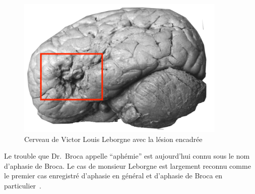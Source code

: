 \begin{figure}[htb]
    \begin{center}
        \includegraphics[width=10cm]{assets/images/leborgne-brain.png}
    \end{center}
    \caption{Cerveau de Victor Louis Leborgne avec la lésion encadrée}
    \label{fig.leborgne-brain}
\end{figure}

Le trouble que Dr.~Broca appelle ``aphémie'' 
est aujourd'hui connu sous le nom d'aphasie de Broca.
Le cas de monsieur Leborgne est largement reconnu comme le premier cas enregistré d'aphasie en général
et d'aphasie de Broca en particulier~\cite{Mohammed_Narayan_Patra_Nanda_2018}.